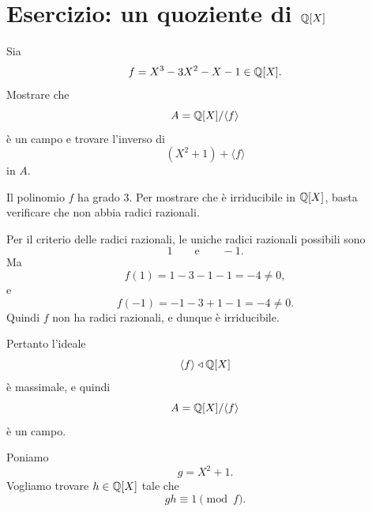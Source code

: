 \documentclass[a4paper]{article}
\begin{document}
\section{Esercizio: un quoziente di \(\mathbb{Q}[X]\)}

\begin{radioactive}
\begin{snippetexercise}{}
    Sia
    \[
        f=X^3-3X^2-X-1\in\mathbb{Q}[X].
    \]
    Mostrare che
    \[
        A=\mathbb{Q}[X]/\langle f \rangle
    \]
    è un campo e trovare l'inverso di
    \[
        (X^2+1)+\langle f \rangle
    \]
    in \(A\).
\end{snippetexercise}
\end{radioactive}

\begin{radioactive}
\begin{snippetsolution}{}
    Il polinomio \(f\) ha grado \(3\). Per mostrare che è irriducibile in \(\mathbb{Q}[X]\), basta verificare che non abbia radici razionali.

    Per il criterio delle radici razionali, le uniche radici razionali possibili sono
    \[
        1
        \qquad
        \text{e}
        \qquad
        -1.
    \]
    Ma
    \[
        f(1)=1-3-1-1=-4\neq 0,
    \]
    e
    \[
        f(-1)=-1-3+1-1=-4\neq 0.
    \]
    Quindi \(f\) non ha radici razionali, e dunque è irriducibile.

    Pertanto l'ideale
    \[
        \langle f \rangle\triangleleft \mathbb{Q}[X]
    \]
    è massimale, e quindi
    \[
        A=\mathbb{Q}[X]/\langle f \rangle
    \]
    è un campo.

    Poniamo
    \[
        g=X^2+1.
    \]
    Vogliamo trovare \(h\in\mathbb{Q}[X]\) tale che
    \[
        gh\equiv 1\pmod f.
    \]


\end{snippetsolution}
\end{radioactive}
\end{document}
